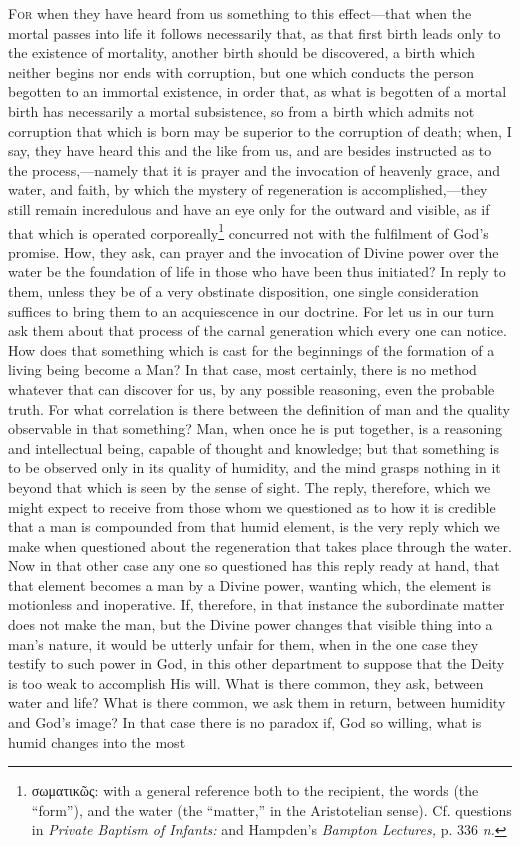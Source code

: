 
\textsc{For} when they have heard from us something to this effect—that when the mortal passes into life it follows necessarily that, as that first birth leads only to the existence of mortality, another birth should be discovered, a birth which neither begins nor ends with corruption, but one which conducts the person begotten to an immortal existence, in order that, as what is begotten of a mortal birth has necessarily a mortal subsistence, so from a birth which admits not corruption that which is born may be superior to the corruption of death; when, I say, they have heard this and the like from us, and are besides instructed as to the process,—namely that it is prayer and the invocation of heavenly grace, and water, and faith, by which the mystery of regeneration is accomplished,—they still remain incredulous and have an eye only for the outward and visible, as if that which is operated corporeally\footnote{\textgreek{σωματικῶς}: with a general reference both to the recipient, the words (the “form”), and the water (the “matter,” in the Aristotelian sense). Cf. questions in \emph{Private Baptism of Infants:} and Hampden’s \emph{Bampton Lectures,} p. 336 \emph{n.}} concurred not with the fulfilment of God’s promise. How, they ask, can prayer and the invocation of Divine power over the water be the foundation of life in those who have been thus initiated? In reply to them, unless they be of a very obstinate disposition, one single consideration suffices to bring them to an acquiescence in our doctrine. For let us in our turn ask them about that process of the carnal generation which every one can notice. How does that something which is cast for the beginnings of the formation of a living being become a Man? In that case, most certainly, there is no method whatever that can discover for us, by any possible reasoning, even the probable truth. For what correlation is there between the definition of man and the quality observable in that something? Man, when once he is put together, is a reasoning and intellectual being, capable of thought and knowledge; but that something is to be observed only in its quality of humidity, and the mind grasps nothing in it beyond that which is seen by the sense of sight. The reply, therefore, which we might expect to receive from those whom we questioned as to how it is credible that a man is compounded from that humid element, is the very reply which we make when questioned about the regeneration that takes place through the water. Now in that other case any one so questioned has this reply ready at hand, that that element becomes a man by a Divine power, wanting which, the element is motionless and inoperative. If, therefore, in that instance the subordinate matter does not make the man, but the Divine power changes that visible thing into a man’s nature, it would be utterly unfair for them, when in the one case they testify to such power in God, in this other department to suppose that the Deity is too weak to accomplish His will. What is there common, they ask, between water and life? What is there common, we ask them in return, between humidity and God’s image? In that case there is no paradox if, God so willing, what is humid changes into the most 